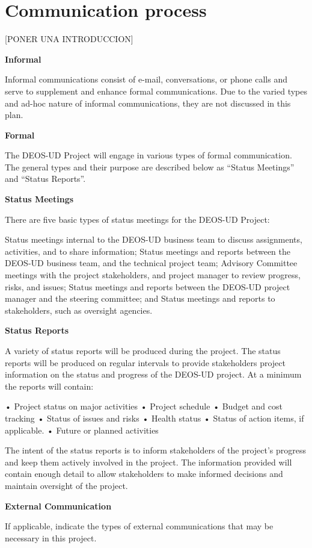 \section{Communication process}

[PONER UNA INTRODUCCION]

\textbf{Informal}

Informal communications consist of e-mail, conversations, or phone calls and serve to supplement and enhance formal communications. Due to the varied types and ad-hoc nature of informal communications, they are not discussed in this plan.

\textbf{Formal}

The DEOS-UD Project will engage in various types of formal communication. The general types and their purpose are described below as “Status Meetings” and “Status Reports”.

\textbf{Status Meetings}

There are five basic types of status meetings for the DEOS-UD Project:

Status meetings internal to the DEOS-UD business team to discuss assignments, activities, and to share information; 
Status meetings and reports between the DEOS-UD business team, and the technical project team; 
Advisory Committee meetings with the project stakeholders, and project manager to review progress, risks, and issues;
Status meetings and reports between the DEOS-UD project manager and the steering committee; and 
Status meetings and reports to stakeholders, such as oversight agencies.



\textbf{Status Reports}

A variety of status reports will be produced during the project. The status reports will be produced on regular intervals to provide stakeholders project information on the status and progress of the DEOS-UD project. At a minimum the reports will contain:

• Project status on major activities
\newline
•	Project schedule
\newline
•	Budget and cost tracking
\newline
•	Status of issues and risks
\newline
•	Health status
\newline
•	Status of action items, if applicable.
\newline
•	Future or planned activities

The intent of the status reports is to inform stakeholders of the project’s progress and keep them actively involved in the project. The information provided will contain enough detail to allow stakeholders to make informed decisions and maintain oversight of the project.

\textbf{External Communication}

If applicable, indicate the types of external communications that may be necessary in this project.

